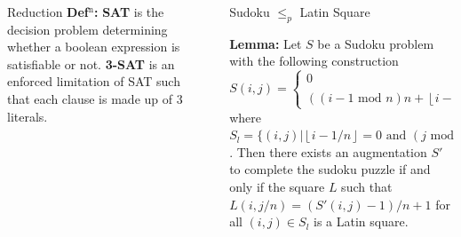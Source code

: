 \documentclass[final]{beamer}
\newlength{\sepwidth}
\newlength{\colwidth}
\newcounter{col}
\newcommand{\separatorcolumn}{\begin{column}{\sepwidth}\end{column}}
\begin{document}
\begin{frame}[t]
\begin{columns}[t]
\begin{column}{\colwidth}
\begin{block}{Reduction}
\textbf{Def$^\text{n}$:}  \textbf{SAT} is the decision problem determining whether a boolean expression is satisfiable or not. \textbf{3-SAT} is an enforced limitation of SAT such that each clause is made up of 3 literals. 
  \end{block}
\end{column}

\separatorcolumn

\begin{column}{\colwidth}
  \begin{block}{Sudoku $\leq_p$ Latin Square}

\textbf{Lemma:} Let $S$ be a Sudoku problem with the following construction 
\begin{equation}
	S(i,j) =\begin{cases}
0 \qquad\qquad\qquad\qquad\qquad\qquad\text{when } (i,j) \in S_l \\ 
((i-1 \text{ mod } n)n + \left\lfloor{i-1/n}\right\rfloor+j-1)\text{ mod } n^2 +1 \quad\text{otherwise}
\end{cases}
\end{equation}
where $S_l=\{(i,j)| \left\lfloor{i-1/n}\right\rfloor=0 \text{ and }(j \text{ mod }n)=1\}$. Then there exists an augmentation $S'$ to complete the sudoku puzzle if and only if the square $L$ such that $L(i,j/n)=(S'(i,j)-1)/n+1$ for all $(i,j) \in S_l$ is a Latin square.


\end{block}
\end{column}
\end{columns}
\end{frame}
\end{document}
